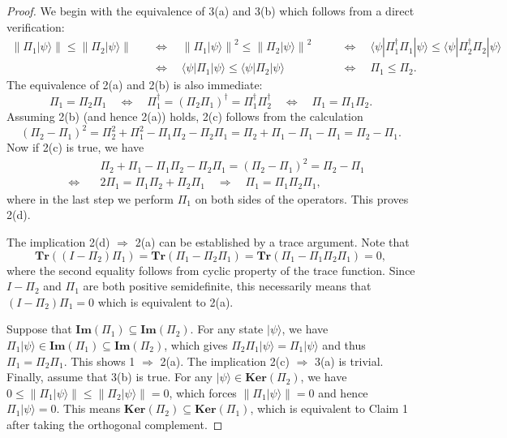 \documentclass[letterpaper,onecolumn,11pt,accepted=2026-02-14]{quantumarticle}
\newcommand{\norm}[1]{\left\lVert#1\right\rVert}
\theoremstyle{remark}
\theoremstyle{plain}
\newcommand{\ket}[1]{|#1\rangle}
\newcommand{\bra}[1]{\langle#1|}
\begin{document}
\begin{proof}
We begin with the equivalence of 3(a) and 3(b) which follows from a direct verification:
\begin{equation}
\begin{aligned}
    \norm{\Pi_1\ket{\psi}}\leq\norm{\Pi_2\ket{\psi}}
    \quad&\Leftrightarrow\quad
    \norm{\Pi_1\ket{\psi}}^2\leq\norm{\Pi_2\ket{\psi}}^2
    \quad&&\Leftrightarrow\quad
    \bra{\psi}\Pi_1^\dagger\Pi_1\ket{\psi}\leq\bra{\psi}\Pi_2^\dagger\Pi_2\ket{\psi}\\
    &\Leftrightarrow\quad\bra{\psi}\Pi_1\ket{\psi}\leq\bra{\psi}\Pi_2\ket{\psi}
    &&\Leftrightarrow\quad\Pi_1\leq\Pi_2.
\end{aligned}
\end{equation}
The equivalence of 2(a) and 2(b) is also immediate:
\begin{equation}
    \Pi_1=\Pi_2\Pi_1
    \quad\Leftrightarrow\quad
    \Pi_1^\dagger=\left(\Pi_2\Pi_1\right)^\dagger=\Pi_1^\dagger\Pi_2^\dagger
    \quad\Leftrightarrow\quad
    \Pi_1=\Pi_1\Pi_2.
\end{equation}
Assuming 2(b) (and hence 2(a)) holds, 2(c) follows from the calculation
\begin{equation}
    (\Pi_2-\Pi_1)^2
    =\Pi_2^2+\Pi_1^2-\Pi_1\Pi_2-\Pi_2\Pi_1
    =\Pi_2+\Pi_1-\Pi_1-\Pi_1=\Pi_2-\Pi_1.
\end{equation}
Now if 2(c) is true, we have
\begin{equation}
\begin{aligned}
    &\Pi_2+\Pi_1-\Pi_1\Pi_2-\Pi_2\Pi_1
    =(\Pi_2-\Pi_1)^2=\Pi_2-\Pi_1\\
    \quad\Leftrightarrow\quad&
    2\Pi_1=\Pi_1\Pi_2+\Pi_2\Pi_1
    \quad\Rightarrow\quad
    \Pi_1=\Pi_1\Pi_2\Pi_1,
\end{aligned}
\end{equation}
where in the last step we perform $\Pi_1$ on both sides of the operators. This proves 2(d).

The implication 2(d) $\Rightarrow$ 2(a) can be established by a trace argument. Note that 
\begin{equation}
    \mathbf{Tr}\left((I-\Pi_2)\Pi_1\right)
    =\mathbf{Tr}\left(\Pi_1-\Pi_2\Pi_1\right)
    =\mathbf{Tr}\left(\Pi_1-\Pi_1\Pi_2\Pi_1\right)
    =0,
\end{equation}
where the second equality follows from cyclic property of the trace function. Since $I-\Pi_2$ and $\Pi_1$ are both positive semidefinite, this necessarily means that $(I-\Pi_2)\Pi_1=0$ which is equivalent to 2(a).

Suppose that $\mathbf{Im}(\Pi_1)\subseteq\mathbf{Im}(\Pi_2)$. For any state $\ket{\psi}$, we have $\Pi_1\ket{\psi}\in\mathbf{Im}(\Pi_1)\subseteq\mathbf{Im}(\Pi_2)$, which gives $\Pi_2\Pi_1\ket{\psi}=\Pi_1\ket{\psi}$ and thus $\Pi_1=\Pi_2\Pi_1$. This shows 1 $\Rightarrow$ 2(a). The implication 2(c) $\Rightarrow$ 3(a) is trivial. Finally, assume that 3(b) is true. For any $\ket{\psi}\in\mathbf{Ker}(\Pi_2)$, we have $0\leq\norm{\Pi_1\ket{\psi}}\leq\norm{\Pi_2\ket{\psi}}=0$, which forces $\norm{\Pi_1\ket{\psi}}=0$ and hence $\Pi_1\ket{\psi}=0$. This means $\mathbf{Ker}(\Pi_2)\subseteq\mathbf{Ker}(\Pi_1)$, which is equivalent to Claim 1 after taking the orthogonal complement.
\end{proof}
\end{document}
